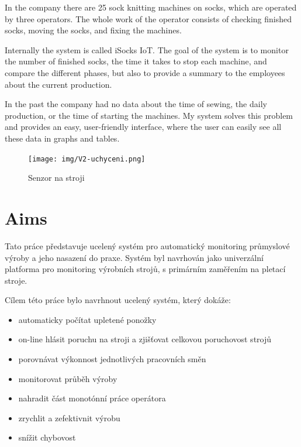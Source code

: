 \documentclass[12pt, a4paper]{article}
\begin{document}
In the company there are 25 sock knitting machines on socks, which are operated by three operators.
The whole work of the operator consists of checking finished socks, moving the socks, and fixing the machines.

Internally the system is called iSocks IoT.
The goal of the system is to monitor the number of finished socks, the time it takes to stop each machine, and compare the different phases, but also to provide a summary to the employees about the current production.

In the past the company had no data about the time of sewing, the daily production, or the time of starting the machines.
My system solves this problem and provides an easy, user-friendly interface, where the user can easily see all these data in graphs and tables.


\begin{figure}[t]
    \centering
    \texttt{[image: img/V2-uchyceni.png]}
    \caption{Senzor na stroji}
    \label{fig:SenzorNaStroji}
\end{figure}


\section*{Aims}

Tato práce představuje ucelený systém pro automatický monitoring průmyslové výroby a jeho nasazení do praxe.
Systém byl navrhován jako univerzální platforma pro monitoring výrobních strojů, s primárním zaměřením na pletací stroje.

Cílem této práce bylo navrhnout ucelený systém, který dokáže:

\begin{itemize}
    \item automaticky počítat upletené ponožky
    \item on-line hlásit poruchu na stroji a zjišťovat celkovou poruchovost strojů
    \item porovnávat výkonnost jednotlivých pracovních směn
    \item monitorovat průběh výroby
    \item nahradit část monotónní práce operátora
    \item zrychlit a zefektivnit výrobu
    \item snížit chybovost
\end{itemize}
\end{document}
